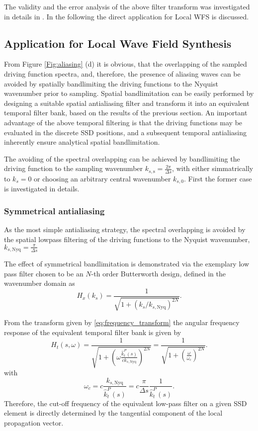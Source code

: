 \documentclass[conference]{IEEEtran}
\begin{document}
The validity and the error analysis of the above filter transform was investigated in details in \cite{Firtha DAGA2023}.
In the following the direct application for Local WFS is discussed. 

\subsection{Application for Local Wave Field Synthesis}

From Figure \ref{Fig:aliasing} (d) it is obvious, that the overlapping of the sampled driving function spectra, and, therefore, the presence of aliasing waves can be avoided by spatially bandlimiting the driving functions to the Nyquist wavenumber prior to sampling.
Spatial bandlimitation can be easily performed by designing a suitable spatial antialiasing filter and transform it into an equivalent temporal filter bank, based on the results of the previous section.
An important advantage of the above temporal filtering is that the driving functions may be evaluated in the discrete SSD positions, and a subsequent temporal antialiasing inherently ensure analytical spatial bandlimitation.

The avoiding of the spectral overlapping can be achieved by bandlimiting the driving function to the sampling wavenumber $k_{s,\mathrm{s}} = \frac{2\pi}{\Delta s}$, with either simmatrically to $k_s = 0$ or choosing an arbitrary central wavenumber $k_{s,0}$.
First the former case is investigated in details.

\subsubsection{Symmetrical antialiasing}
As the most simple antialiasing strategy, the spectral overlapping is avoided by the spatial lowpass filtering of the driving functions to the Nyquist wavenumber, $k_{s,\mathrm{Nyq}} = \frac{\pi}{\Delta s}$

The effect of symmetrical bandlimitation is demonstrated via the exemplary low pass filter chosen to be an $N$-th order Butterworth design, defined in the wavenumber domain as
\begin{equation}
    H_x(k_s) = \frac{ 1 }{ \sqrt{ 1 + \left( k_s / k_{s,\mathrm{Nyq}} \right)^{2N} } }.
\end{equation}

From the transform given by \eqref{eq:frequency_transform} the angular frequency response of the equivalent temporal filter bank is given by
\begin{equation}
    H_t(s,\omega) = \frac{ 1 }{ \sqrt{ 1 + \left( \omega\frac{\hat{k}_t^P(s)}{c k_{s,\mathrm{Nyq}}}  \right)^{2N} } } =  \frac{ 1 }{ \sqrt{ 1 + \left( \frac{\omega}{\omega_c}  \right)^{2N} } } .
\end{equation}
with 
\begin{equation}
    \omega_c = c \frac{k_{s,\mathrm{Nyq}}}{\hat{k}_t^P(s)} = c\frac{ \pi}{\Delta s} \frac{1}{\hat{k}_t^P(s)}.
    \label{eq:cutoff_fr}
\end{equation}
Therefore, the cut-off frequency of the equivalent low-pass filter on a given SSD element is directly determined by the tangential component of the local propagation vector.
\end{document}
